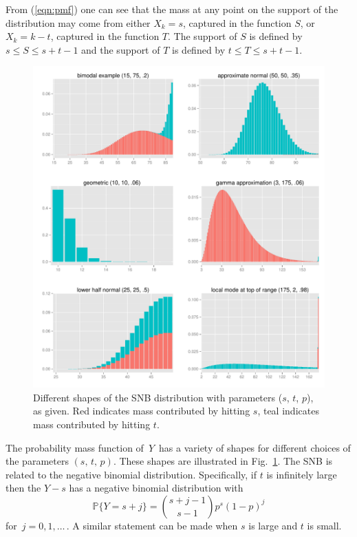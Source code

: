 \documentclass[12pt]{article}         %
\begin{document}
From (\ref{eqn:pmf}) one can see that the mass at any point on the support 
of the distribution may come from either $X_k = s$, captured in the 
function $S$, or $X_k = k-t$, captured in the function $T$. The support of 
$S$ is defined by $s \leq S \leq s+t-1$ and the support of $T$ is defined 
by $t \leq T \leq s+t-1$.

\begin{figure}[p!]
\begin{center}
\includegraphics[width=\textwidth]{shapes.pdf}
\end{center}
\caption{Different shapes of the SNB distribution with parameters ($s$, $t$, $p$), as given. Red indicates mass contributed by hitting $s$, teal indicates
mass contributed by hitting $t$. \label{shapes.fig}}
\end{figure}

The probability mass function of $\,Y\,$ has a variety of shapes for different choices of the parameters $(s,\, t,\,p)$.
These shapes are illustrated in Fig.~\ref{shapes.fig}.
The SNB is related to the negative binomial distribution. Specifically, if 
$t$ is infinitely large then the $Y-s$ has a negative binomial distribution 
with
\begin{equation*}                                    %
   \mathbb{P}\{Y=s+j \}        \label{nb1.eq}
          = {{s+j-1}\choose{s-1}} p^s (1-p)^j
\end{equation*}
for $\,j=0, 1,\ldots\,$. A similar statement can be made when $s$ is large
and $t$ is small.
\end{document}

